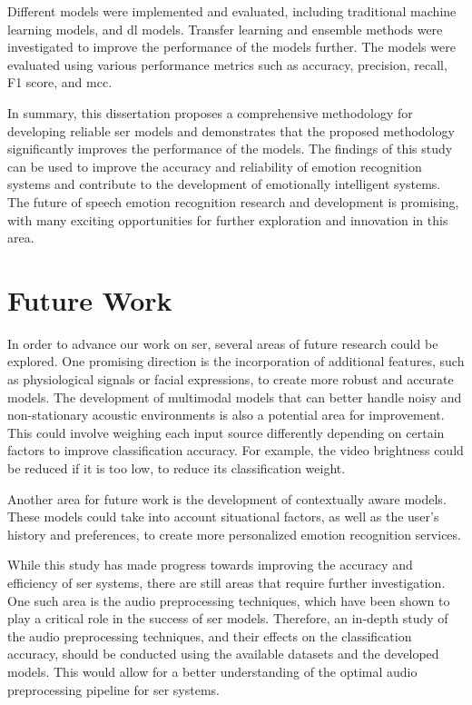 Different models were implemented and evaluated, including traditional machine learning models, and \ac{dl} models. Transfer learning and ensemble methods were investigated to improve the performance of the models further. The models were evaluated using various performance metrics such as accuracy, precision, recall, F1 score, and \ac{mcc}.

In summary, this dissertation proposes a comprehensive methodology for developing reliable \ac{ser} models and demonstrates that the proposed methodology significantly improves the performance of the models. The findings of this study can be used to improve the accuracy and reliability of emotion recognition systems and contribute to the development of emotionally intelligent systems. The future of speech emotion recognition research and development is promising, with many exciting opportunities for further exploration and innovation in this area.


\section{Future Work}

In order to advance our work on \ac{ser}, several areas of future research could be explored. One promising direction is the incorporation of additional features, such as physiological signals or facial expressions, to create more robust and accurate models. The development of multimodal models that can better handle noisy and non-stationary acoustic environments is also a potential area for improvement. This could involve weighing each input source differently depending on certain factors to improve classification accuracy. For example, the video brightness could be reduced if it is too low, to reduce its classification weight.

Another area for future work is the development of contextually aware models. These models could take into account situational factors, as well as the user's history and preferences, to create more personalized emotion recognition services.

While this study has made progress towards improving the accuracy and efficiency of \ac{ser} systems, there are still areas that require further investigation. One such area is the audio preprocessing techniques, which have been shown to play a critical role in the success of \ac{ser} models. Therefore, an in-depth study of the audio preprocessing techniques, and their effects on the classification accuracy, should be conducted using the available datasets and the developed models. This would allow for a better understanding of the optimal audio preprocessing pipeline for \ac{ser} systems.

